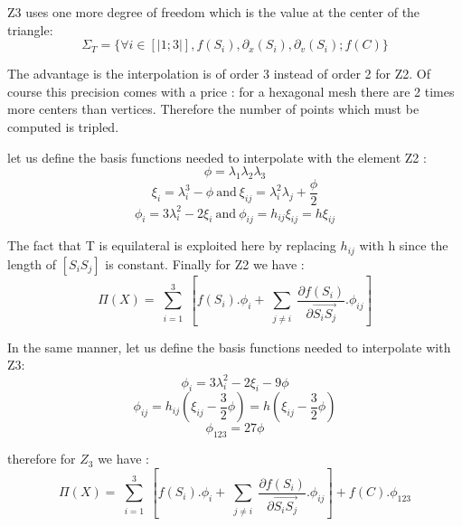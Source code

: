 \documentclass[proc]{edpsmath}
\begin{document}
 \noindent Z3 uses one more degree of freedom which is the value at the center of the triangle:
\begin{equation*}
 \Sigma_T = \lbrace \forall i \in [|1;3|], f(S_i),\partial_x(S_i),\partial_v(S_i); f(C) \rbrace 
\end{equation*}

 \noindent The advantage is the interpolation is of order 3 instead of order 2 for Z2. Of course this precision comes with a price : for a hexagonal mesh there are 2 times more centers than vertices. Therefore the number of points which must be computed is tripled. 

\noindent let us define the basis functions needed to interpolate with the element Z2 : \\
\begin{equation*}
\phi = \lambda_1 \lambda_2 \lambda_3 
\end{equation*}
\begin{equation*}
\xi _i= \lambda_i^3 - \phi ~\text{and}~ \xi_{ij}= \lambda_{i}^2 \lambda_j + \frac{\phi}{2} 
\end{equation*}
\begin{equation*}
\phi_i = 3\lambda_{i}^2 -2 \xi_i ~\text{and} ~\phi_{ij} = h_{ij} \xi_{ij}=h \xi_{ij}
\end{equation*}


\noindent The fact that T is equilateral is exploited here by replacing $h_{ij}$ with h since the length of $ [S_iS_j]$ is constant. Finally for Z2 we have :
\begin{equation*}
 \Pi (X) = \sum \limits_{\substack{i=1 }}^{3}{ [f(S_i).\phi_i + \sum \limits_{\substack{j\neq i }}^{}{ \frac{\partial f(S_i)}{\partial  \overrightarrow{ S_i S_j } }.\phi_{ij} } ] } 
\end{equation*}

\noindent In the same manner, let us define the basis functions needed to interpolate with Z3: 
\begin{equation*}
\phi_i = 3\lambda_{i}^2 -2 \xi_i - 9 \phi
\end{equation*}
\begin{equation*}
\phi_{ij} = h_{ij} (\xi_{ij} -\frac{3}{2}\phi)=h (\xi_{ij} -\frac{3}{2}\phi)
\end{equation*}
\begin{equation*}
\phi_{123}=27\phi
\end{equation*}

\noindent therefore for $Z_3$ we have :
\begin{equation*}
 \Pi (X) = \sum \limits_{\substack{i=1 }}^{3}{ [f(S_i).\phi_i + \sum \limits_{\substack{j\neq i }}^{}{ \frac{\partial f(S_i)}{\partial  \overrightarrow{ S_i S_j } }.\phi_{ij} } ] } + f(C).\phi_{123}
\end{equation*}
\end{document}
